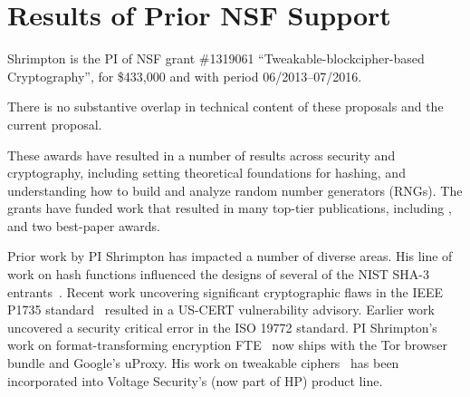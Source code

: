 \section{Results of Prior NSF Support}
\label{sec:prior}


Shrimpton is the PI of NSF grant \#1319061 
``Tweakable-blockcipher-based Cryptography'', for \$433,000 and with
period 06/2013--07/2016. 

There is no substantive overlap in technical
content of these proposals and the current proposal.

 These awards have resulted in a number of results
across security and cryptography, including setting theoretical foundations for
hashing, and understanding how
to build and analyze random number generators (RNGs). The grants have funded work that
resulted in many top-tier publications, including
\cite{DRS09,BCS-journal09,OSS,BRSS10,fischlin2010random,RSS,PRS11,dyer2012peek,clrw,tct,Dyer-2013,luchaup2014libfte,luchaup2014formatted},
and two best-paper awards. 

  Prior work by PI Shrimpton has impacted a
number of diverse areas.  His line of work on hash functions influenced the designs of several of the NIST
SHA-3 entrants~\cite{DRS09,BCS-journal09,BRSS10,RSS}.  
%
Recent work uncovering significant cryptographic flaws in the IEEE
P1735 standard~\cite{CNS+17} resulted in a US-CERT vulnerability
advisory.  Earlier work~\cite{NRS} uncovered a security critical error
in the ISO 19772 standard.
%
PI Shrimpton's work on format-transforming encryption FTE~\cite{Dyer-2013,luchaup2014libfte,luchaup2014formatted}
now ships with the Tor browser bundle and Google's uProxy. 
%
His work on tweakable ciphers~\cite{clrw,tct} has been incorporated into
Voltage Security's (now part of HP) product line.






